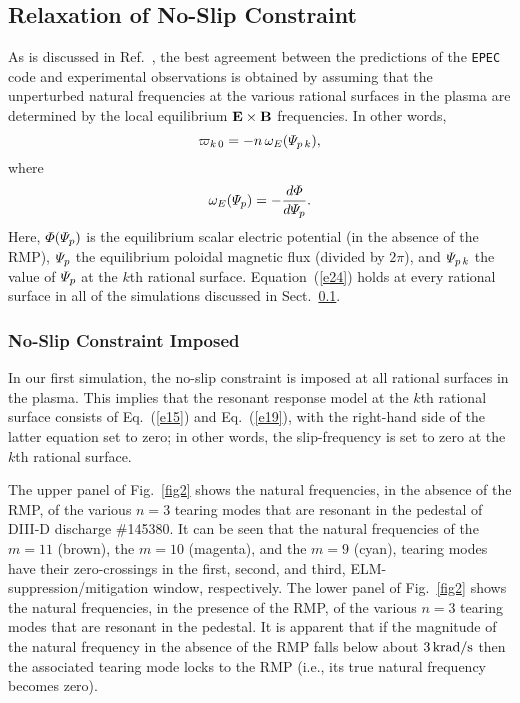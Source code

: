 \documentclass[12pt,prb,aps]{revtex4-1}
\begin{document}
\subsection{Relaxation of No-Slip Constraint}\label{s4a}
As is discussed in Ref.~, the best agreement between the predictions of the {\tt EPEC} code and experimental observations is
obtained by assuming that the unperturbed natural frequencies at the various rational surfaces in the plasma are determined by the
local equilibrium ${\bf E}\times {\bf B}$ frequencies. In other words, 
\begin{equation}\label{e24}
\varpi_{k\,0} =-n\,\omega_E({\mit\Psi}_{p\,k}),
\end{equation}
where 
\begin{equation}
\omega_E({\mit\Psi}_p) = -\frac{d{\mit\Phi}}{d{\mit\Psi}_p}.
\end{equation}
Here, ${\mit\Phi}({\mit\Psi}_p)$ is the equilibrium scalar electric potential (in the absence of the RMP), ${\mit\Psi}_p$ the equilibrium poloidal magnetic flux (divided by $2\pi$), 
and ${\mit\Psi}_{p\,k}$  the value of ${\mit\Psi}_p$ at the $k$th rational surface.  Equation~(\ref{e24}) holds at
every rational surface in all of the simulations discussed in Sect.~\ref{s4a}. 

\subsubsection{No-Slip Constraint Imposed}
In our first simulation, the no-slip constraint is imposed at all rational surfaces in the plasma. This implies that the resonant response
model at the $k$th rational surface consists of Eq.~(\ref{e15}) and Eq.~(\ref{e19}), with the right-hand side of the latter equation
set to zero; in other words,  the slip-frequency is set to zero at the $k$th rational surface.

The upper panel of Fig.~\ref{fig2} shows the natural frequencies, in the absence of the RMP, of the various  $n=3$ tearing modes 
 that are resonant in the pedestal of DIII-D discharge \#145380. It can be seen that 
the natural frequencies of the $m=11$ (brown), the $m=10$ (magenta), and the $m=9$ (cyan), tearing modes have their
zero-crossings in the  first, second, and third, ELM-suppression/mitigation window, respectively. 
  The lower panel of Fig.~\ref{fig2} shows the natural frequencies, in the presence of the RMP, of the various $n=3$
tearing modes that are resonant in the pedestal. It is apparent that if the magnitude of the natural frequency in the absence of the RMP falls below about
$3\,{\rm krad/s}$ then the associated tearing mode locks to the RMP (i.e., its true natural frequency becomes zero). 
\end{document}
